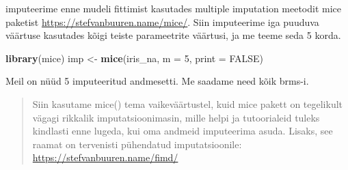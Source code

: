\documentclass[]{book}
\newenvironment{Shaded}{\begin{snugshade}}{\end{snugshade}}
\newcommand{\CommentTok}[1]{\textcolor[rgb]{0.56,0.35,0.01}{\textit{#1}}}
\newcommand{\DataTypeTok}[1]{\textcolor[rgb]{0.13,0.29,0.53}{#1}}
\newcommand{\DecValTok}[1]{\textcolor[rgb]{0.00,0.00,0.81}{#1}}
\newcommand{\KeywordTok}[1]{\textcolor[rgb]{0.13,0.29,0.53}{\textbf{#1}}}
\newcommand{\NormalTok}[1]{#1}
\newcommand{\OperatorTok}[1]{\textcolor[rgb]{0.81,0.36,0.00}{\textbf{#1}}}
\newcommand{\OtherTok}[1]{\textcolor[rgb]{0.56,0.35,0.01}{#1}}
\newcommand{\StringTok}[1]{\textcolor[rgb]{0.31,0.60,0.02}{#1}}
\begin{document}
\begin{Shaded}
\end{Shaded}

\begin{Shaded}
\end{Shaded}

imputeerime enne mudeli fittimist kasutades multiple imputation meetodit mice paketist \url{https://stefvanbuuren.name/mice/}.
Siin imputeerime iga puuduva väärtuse kasutades kõigi teiste parameetrite väärtusi, ja me teeme seda 5 korda.

\begin{Shaded}
\begin{Highlighting}[]
\KeywordTok{library}\NormalTok{(mice)}
\NormalTok{imp <-}\StringTok{ }\KeywordTok{mice}\NormalTok{(iris_na, }\DataTypeTok{m =} \DecValTok{5}\NormalTok{, }\DataTypeTok{print =} \OtherTok{FALSE}\NormalTok{)}
\end{Highlighting}
\end{Shaded}

Meil on nüüd 5 imputeeritud andmesetti. Me saadame need kõik brms-i.

\begin{quote}
Siin kasutame mice() tema vaikeväärtustel, kuid mice pakett on tegelikult vägagi rikkalik imputatsioonimasin, mille helpi ja tutoorialeid tuleks kindlasti enne lugeda, kui oma andmeid imputeerima asuda. Lisaks, see raamat on tervenisti pühendatud imputatsioonile: \url{https://stefvanbuuren.name/fimd/}
\end{quote}
\end{document}
